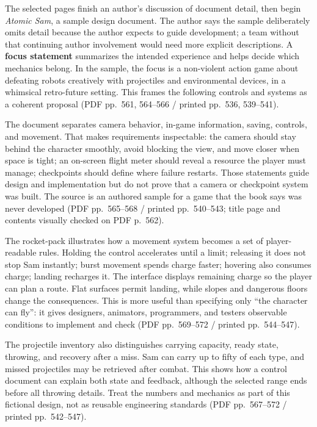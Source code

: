 \hypertarget{05-engine-i-ch009-a-design-document-can-specify-a-playable-contract-without-pretending-a-game-exists}{}

The selected pages finish an author's discussion of document detail, then begin \emph{Atomic Sam}, a sample design document. The author says the sample deliberately omits detail because the author expects to guide development; a team without that continuing author involvement would need more explicit descriptions. A \textbf{focus statement} summarizes the intended experience and helps decide which mechanics belong. In the sample, the focus is a non-violent action game about defeating robots creatively with projectiles and environmental devices, in a whimsical retro-future setting. This frames the following controls and systems as a coherent proposal (PDF pp.~561, 564--566 / printed pp.~536, 539--541).

The document separates camera behavior, in-game information, saving, controls, and movement. That makes requirements inspectable: the camera should stay behind the character smoothly, avoid blocking the view, and move closer when space is tight; an on-screen flight meter should reveal a resource the player must manage; checkpoints should define where failure restarts. Those statements guide design and implementation but do not prove that a camera or checkpoint system was built. The source is an authored sample for a game that the book says was never developed (PDF pp.~565--568 / printed pp.~540--543; title page and contents visually checked on PDF p.~562).

The rocket-pack illustrates how a movement system becomes a set of player-readable rules. Holding the control accelerates until a limit; releasing it does not stop Sam instantly; burst movement spends charge faster; hovering also consumes charge; landing recharges it. The interface displays remaining charge so the player can plan a route. Flat surfaces permit landing, while slopes and dangerous floors change the consequences. This is more useful than specifying only ``the character can fly'': it gives designers, animators, programmers, and testers observable conditions to implement and check (PDF pp.~569--572 / printed pp.~544--547).

The projectile inventory also distinguishes carrying capacity, ready state, throwing, and recovery after a miss. Sam can carry up to fifty of each type, and missed projectiles may be retrieved after combat. This shows how a control document can explain both state and feedback, although the selected range ends before all throwing details. Treat the numbers and mechanics as part of this fictional design, not as reusable engineering standards (PDF pp.~567--572 / printed pp.~542--547).

